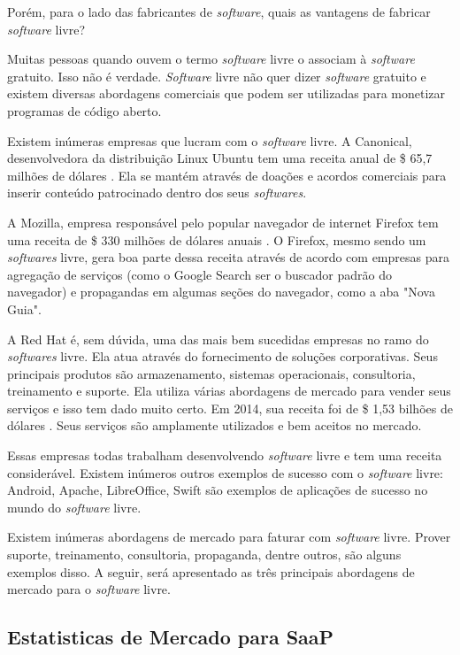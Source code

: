 \documentclass{classe_cn}                 %
\begin{document}
Porém, para o lado das fabricantes de \textit{software}, quais as vantagens de fabricar \textit{software} livre?

Muitas pessoas quando ouvem o termo \textit{software} livre o associam à \textit{software} gratuito. Isso não é verdade. \textit{Software} livre não quer dizer \textit{software} gratuito e existem diversas abordagens comerciais que podem ser utilizadas para monetizar programas de código aberto.

Existem inúmeras empresas que lucram com o \textit{software} livre. A Canonical, desenvolvedora da distribuição Linux Ubuntu tem uma receita anual de \$ 65,7 milhões de dólares \cite{Brodkin}. Ela se mantém através de doações e acordos comerciais para inserir conteúdo patrocinado dentro dos seus \textit{softwares}.

A Mozilla, empresa responsável pelo popular navegador de internet Firefox tem uma receita de \$ 330 milhões de dólares anuais \cite{Mozilla}. O Firefox, mesmo sendo  um \textit{softwares} livre, gera boa parte dessa receita através de acordo com empresas para agregação de serviços (como o Google Search ser o buscador padrão do navegador) e propagandas em algumas seções do navegador, como a aba "Nova Guia".

A Red Hat é, sem dúvida, uma das mais bem sucedidas empresas no ramo do \textit{softwares} livre. Ela atua através do fornecimento de soluções corporativas. Seus principais produtos são armazenamento, sistemas operacionais, consultoria, treinamento e suporte. Ela utiliza várias abordagens de mercado para vender seus serviços e isso tem dado muito certo. Em 2014, sua receita foi de \$ 1,53 bilhões de dólares \cite{Red}. Seus serviços são amplamente utilizados e bem aceitos no mercado.

Essas empresas todas trabalham desenvolvendo \textit{software} livre e tem uma receita considerável. Existem inúmeros outros exemplos de sucesso com o \textit{software} livre: Android, Apache, LibreOffice, Swift são exemplos de aplicações de sucesso no mundo do \textit{software} livre. 

Existem inúmeras abordagens de mercado para faturar com \textit{software} livre. Prover suporte, treinamento, consultoria, propaganda, dentre outros, são alguns exemplos disso. A seguir, será apresentado as três principais abordagens de mercado para o \textit{software} livre.

\subsection{Estatisticas de Mercado para SaaP}
\end{document}
